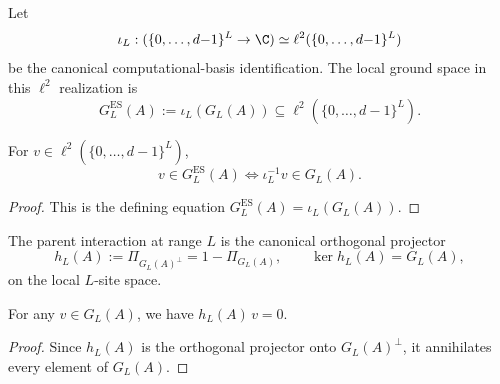 \begin{definition}\label{def:ground_space_es}
    \leanok
    Let
    \[
        \iota_L :
        (\{0,\ldots,d{-}1\}^{L}\to\C)
        \simeq \ell^{2}(\{0,\ldots,d{-}1\}^{L})
    \]
    be the canonical computational-basis identification. The local ground space
    in this $\ell^2$ realization is
    \[
        G_{L}^{\mathrm{ES}}(A):=\iota_L(G_L(A))
        \subseteq \ell^{2}(\{0,\ldots,d{-}1\}^{L}).
    \]
\end{definition}

\begin{lemma}\label{lem:mem_ground_space_es}
    \leanok
    For $v\in\ell^{2}(\{0,\ldots,d{-}1\}^{L})$,
    \[
        v\in G_L^{\mathrm{ES}}(A)
        \Longleftrightarrow
        \iota_L^{-1}v\in G_L(A).
    \]
\end{lemma}

\begin{proof}
    \leanok
    This is the defining equation
    $G_L^{\mathrm{ES}}(A)=\iota_L(G_L(A))$.
\end{proof}

\begin{definition}\label{def:parent_interaction}
    \leanok
    The parent interaction at range $L$ is the canonical orthogonal projector
    \[
        h_L(A) := \Pi_{G_L(A)^\perp}=1-\Pi_{G_L(A)},
        \qquad
        \ker h_L(A)=G_L(A),
    \]
    on the local $L$-site space.
\end{definition}

\begin{lemma}%
    \label{lem:parent_interaction_apply_mem_ground_space}
    \leanok
    For any $v \in G_L(A)$, we have $h_L(A)\,v = 0$.
\end{lemma}

\begin{proof}
    \leanok
    Since $h_L(A)$ is the orthogonal projector onto $G_L(A)^\perp$, it
    annihilates every element of $G_L(A)$.
\end{proof}

